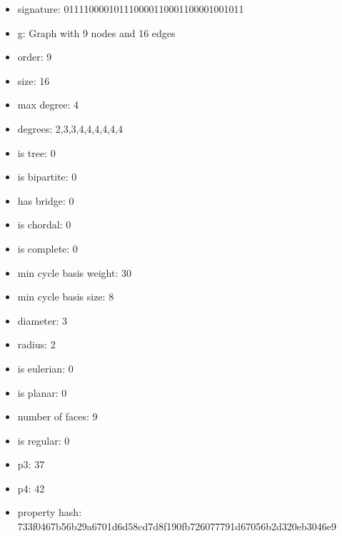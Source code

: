 \newpage
\begin{figure}
\end{figure}
\begin{itemize}
\item signature: 011110000101110000110001100001001011
\item g: Graph with 9 nodes and 16 edges
\item order: 9
\item size: 16
\item max degree: 4
\item degrees: 2,3,3,4,4,4,4,4,4
\item is tree: 0
\item is bipartite: 0
\item has bridge: 0
\item is chordal: 0
\item is complete: 0
\item min cycle basis weight: 30
\item min cycle basis size: 8
\item diameter: 3
\item radius: 2
\item is eulerian: 0
\item is planar: 0
\item number of faces: 9
\item is regular: 0
\item p3: 37
\item p4: 42
\item property hash: 733f0467b56b29a6701d6d58cd7d8f190fb726077791d67056b2d320eb3046e9
\end{itemize}
